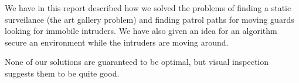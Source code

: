 We have in this report described how we solved the problems of finding a static surveilance (the art gallery problem) and finding patrol paths for moving guards looking for immobile intruders.
We have also given an idea for an algorithm secure an environment while the intruders are moving around.

None of our solutions are guaranteed to be optimal, but visual inspection suggests them to be quite good.
